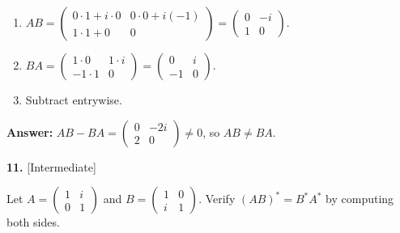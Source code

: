 \documentclass[11pt]{article}
\begin{document}
\begin{tcolorbox}[breakable,colback=ans,colframe=ansb,boxrule=0.5pt,left=4pt,right=4pt,top=2pt,bottom=2pt]\begin{enumerate}[leftmargin=2.2em,itemsep=1pt,topsep=1pt,label=\textbf{Step \arabic*.}]\item $AB=\begin{pmatrix}0\cdot1+i\cdot0&0\cdot0+i(-1)\\1\cdot1+0&0\end{pmatrix}=\begin{pmatrix}0&-i\\1&0\end{pmatrix}$.
\item $BA=\begin{pmatrix}1\cdot0&1\cdot i\\-1\cdot1&0\end{pmatrix}=\begin{pmatrix}0&i\\-1&0\end{pmatrix}$.
\item Subtract entrywise.
\end{enumerate}\textbf{Answer:} $AB-BA=\begin{pmatrix}0&-2i\\2&0\end{pmatrix}\neq0$, so $AB\ne BA$.\end{tcolorbox}
\par\vspace{2pt}
\begin{minipage}{\linewidth}\textbf{11.} \hfill{\scriptsize\color{ink}[Intermediate]}\par\nopagebreak Let $A=\begin{pmatrix}1&i\\0&1\end{pmatrix}$ and $B=\begin{pmatrix}1&0\\i&1\end{pmatrix}$. Verify $(AB)^{*}=B^{*}A^{*}$ by computing both sides.
\end{minipage}\par\nopagebreak
\end{document}
